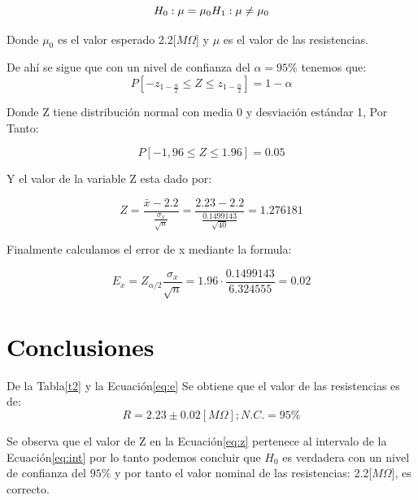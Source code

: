 \documentclass[11pt]{article}
\begin{document}
\begin{multicols}{2}
        \begin{equation}
            H_0: \mu = \mu_0 \\
            H_1: \mu \neq \mu_0
        \end{equation}

        Donde $\mu_0$ es el valor esperado 2.2[$M\Omega$] y $\mu$ es el valor de las resistencias.

        De ahí se sigue que con un nivel de confianza del $\alpha = 95\%$ tenemos que:
        \begin{equation}
            P[-z_{1- \frac{\alpha}{2}} \leq Z \leq z_{1- \frac{\alpha}{2}}] = 1-\alpha
        \end{equation}

        Donde Z tiene distribución normal con media 0 y desviación estándar 1, Por Tanto:

        \begin{equation}
            P[-1,96 \leq Z \leq 1.96] = 0.05\label{eq:int}
        \end{equation}

        Y el valor de la variable Z esta dado por:

        \begin{equation}
            Z = \frac{\bar{x} - 2.2}{\frac{\sigma_x}{\sqrt {n}}} = \frac{2.23-2.2}{\frac{0.1499143}{\sqrt {40}}} = 1.276181\label{eq:z}
        \end{equation}


        Finalmente calculamos el error de x mediante la formula:
        
        \begin{equation}
            E_x = Z_{\alpha/2} \frac{\sigma_x}{\sqrt{n}} = 1.96 \cdot \frac{0.1499143}{6.324555} = 0.02\label{eq:e}
        \end{equation}

        \section{\textbf{\textcolor{black}{Conclusiones}}}
        \noindent De la Tabla\ref{t2} y la Ecuación\ref{eq:e} Se obtiene que el valor de las
        resistencias es de:
        \[
            R = 2.23\pm0.02\left[ M\Omega \right]; N.C. = 95\%
        \]

        Se observa que el valor de Z en la Ecuación\ref{eq:z} pertenece al intervalo
        de la Ecuación\ref{eq:int} por lo tanto podemos concluir que $H_0$ es verdadera con un
        nivel de confianza del $95\%$ y por tanto el valor nominal de las resistencias: 2.2[$M\Omega$],
        es correcto.



\end{multicols}
\end{document}
